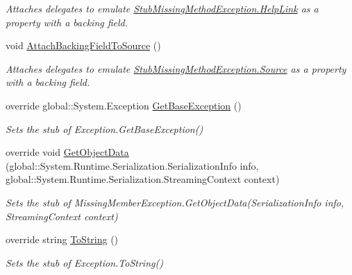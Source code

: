 \begin{DoxyCompactItemize}
\begin{DoxyCompactList}\small\item\em Attaches delegates to emulate \hyperlink{class_system_1_1_fakes_1_1_stub_missing_method_exception_a232306efba00acc1ebc426224826b4c7}{Stub\-Missing\-Method\-Exception.\-Help\-Link} as a property with a backing field.\end{DoxyCompactList}\item 
void \hyperlink{class_system_1_1_fakes_1_1_stub_missing_method_exception_a5e380ab653e7798c8a58b490d25ced5d}{Attach\-Backing\-Field\-To\-Source} ()
\begin{DoxyCompactList}\small\item\em Attaches delegates to emulate \hyperlink{class_system_1_1_fakes_1_1_stub_missing_method_exception_a8e285963b095d11daa446fc29f036ecb}{Stub\-Missing\-Method\-Exception.\-Source} as a property with a backing field.\end{DoxyCompactList}\item 
override global\-::\-System.\-Exception \hyperlink{class_system_1_1_fakes_1_1_stub_missing_method_exception_a1de058857e8decd439be596d8a425aa8}{Get\-Base\-Exception} ()
\begin{DoxyCompactList}\small\item\em Sets the stub of Exception.\-Get\-Base\-Exception()\end{DoxyCompactList}\item 
override void \hyperlink{class_system_1_1_fakes_1_1_stub_missing_method_exception_a6f878b0bedcabdc42fa906c522aaa6e3}{Get\-Object\-Data} (global\-::\-System.\-Runtime.\-Serialization.\-Serialization\-Info info, global\-::\-System.\-Runtime.\-Serialization.\-Streaming\-Context context)
\begin{DoxyCompactList}\small\item\em Sets the stub of Missing\-Member\-Exception.\-Get\-Object\-Data(\-Serialization\-Info info, Streaming\-Context context)\end{DoxyCompactList}\item 
override string \hyperlink{class_system_1_1_fakes_1_1_stub_missing_method_exception_a86810be9e3ed262ba73552dcded5c6ca}{To\-String} ()
\begin{DoxyCompactList}\small\item\em Sets the stub of Exception.\-To\-String()\end{DoxyCompactList}\end{DoxyCompactItemize}
